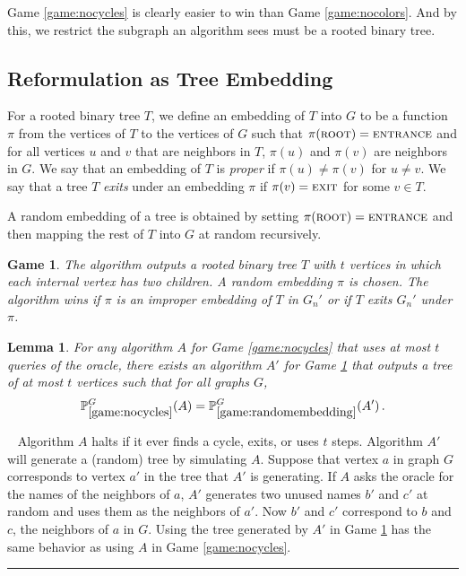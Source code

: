 \documentclass[aps,11pt,twoside,nofootinbib,tightenlines,superscriptaddress,preprintnumbers]{revtex4}
\newcommand{\<}{\langle}
\renewcommand{\>}{\rangle}
\newcommand{\be}{\begin{equation}}
\newcommand{\ee}{\end{equation}}
\newcommand{\ent}{{\textsc{entrance}}}
\newcommand{\exit}{{\textsc{exit}}}
\renewcommand{\root}{{\textsc{root}}}
\newtheorem{lemma}[theorem]{Lemma}
\newtheorem{game}{Game}
\newcommand{\qed}{\rule{7pt}{7pt}}
\newenvironment{proof}
  {\trivlist\item\noindent{\bf Proof}~}
  {\qed\endtrivlist}
\newenvironment{proof sketch}
{\trivlist\item\noindent{\bf Proof sketch}~}
{\qed\endtrivlist}
\begin{document}
Game \ref{game:nocycles} is clearly easier to win than Game \ref{game:nocolors}. And by this, we restrict the subgraph an algorithm sees must be a rooted binary tree.

\subsection{Reformulation as Tree Embedding}

For a rooted binary tree $T$, we define an embedding of $T$ into $G$ to be a function $\pi$ from the vertices of $T$ to the vertices of $G$ such that $\pi(\root) = \ent$ and for all vertices $u$ and $v$ that are neighbors in $T$, $\pi(u)$ and $\pi(v)$ are neighbors in $G$.  We say that an embedding of $T$ is {\em proper} if $\pi(u) \not = \pi(v)$ for $u \ne v$.  We say that a tree $T$ {\em exits} under an embedding $\pi$ if $\pi(v) = \exit$ for some $v \in T$.

 A random embedding of a tree is obtained by setting $\pi(\root) = \ent$ and then mapping the rest of $T$ into $G$ at random recursively.


\begin{game}\label{game:randomembedding}
  The algorithm outputs a rooted binary tree $T$ with $t$ vertices in
  which each internal vertex has two children.  A random embedding $\pi$ is chosen.
  The algorithm wins if $\pi$ is an improper embedding of $T$ in $G_n'$ or if $T$ exits $G_n'$ under $\pi$.
\end{game}


\begin{lemma}\label{lem:equivalence}
For any algorithm $A$ for Game \ref{game:nocycles} that uses at most $t$
queries of the oracle, there exists an algorithm $A'$ for Game
\ref{game:randomembedding} that outputs a tree of at most $t$ vertices
such that for all graphs $G$,
\be
    \mathbb{P}^{G}_{\ref{game:nocycles}}(A) 
  = \mathbb{P}^{G}_{\ref{game:randomembedding}}(A')
\,.
\ee
\end{lemma}

\begin{proof}
Algorithm $A$ halts if it ever finds a cycle, exits, or uses $t$ steps.
Algorithm $A'$ will generate a (random) tree by simulating $A$.  Suppose
that vertex $a$ in graph $G$ corresponds to vertex $a'$ in the tree that
$A'$ is generating.  If $A$ asks the oracle for the names of the neighbors
of $a$, $A'$ generates two unused names $b'$ and $c'$ at random and uses
them as the neighbors of $a'$.  Now $b'$ and $c'$ correspond to $b$ and
$c$, the neighbors of $a$ in $G$.  Using the tree generated by $A'$ in
Game \ref{game:randomembedding} has the same behavior as using $A$ in Game
\ref{game:nocycles}.
\end{proof}
\end{document}
